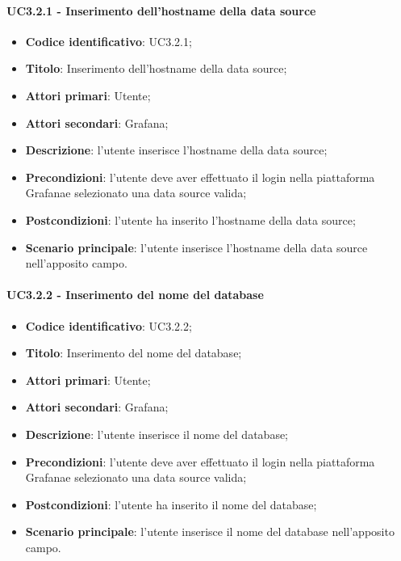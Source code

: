         \paragraph{UC3.2.1 - Inserimento dell'hostname della data source}
            \begin{itemize}
                \item \textbf{Codice identificativo}: UC3.2.1;
                \item \textbf{Titolo}: Inserimento dell'hostname della data source;
                \item \textbf{Attori primari}: Utente;
                \item \textbf{Attori secondari}: Grafana\glo;
                \item \textbf{Descrizione}: l'utente inserisce l'hostname della data source;
                \item \textbf{Precondizioni}: l'utente deve aver effettuato il login nella piattaforma Grafana\glosp e selezionato una data source valida;
                \item \textbf{Postcondizioni}: l'utente ha inserito l'hostname della data source;
                \item \textbf{Scenario principale}: l'utente inserisce l'hostname della data source nell'apposito campo.
            \end{itemize}
        \paragraph{UC3.2.2 - Inserimento del nome del database}
            \begin{itemize}
                \item \textbf{Codice identificativo}: UC3.2.2;
                \item \textbf{Titolo}: Inserimento del nome del database;
                \item \textbf{Attori primari}: Utente;
                \item \textbf{Attori secondari}: Grafana\glo;
                \item \textbf{Descrizione}: l'utente inserisce il nome del database;
                \item \textbf{Precondizioni}: l'utente deve aver effettuato il login nella piattaforma Grafana\glosp e selezionato una data source valida;
                \item \textbf{Postcondizioni}: l'utente ha inserito il nome del database;
                \item \textbf{Scenario principale}: l'utente inserisce il nome del database nell'apposito campo.
            \end{itemize}
